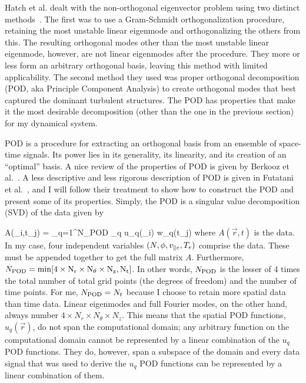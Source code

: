 Hatch et al. dealt with the non-orthogonal eigenvector problem using two distinct methods~\cite{hatch2011}. The first was to use a Gram-Schmidt orthogonalization
procedure, retaining the most unstable linear eigenmode and orthogonalizing the others from this. The resulting orthogonal modes other than the most unstable linear eigenmode, however, are not
linear eigenmodes after the procedure. They more or less form an arbitrary orthogonal basis, leaving this method with limited applicability. 
The second method they used was proper orthogonal decomposition (POD, aka Principle Component Analysis) to create orthogonal modes that best
captured the dominant turbulent structures. The POD has properties that make it the most desirable decomposition (other than the one in the previous section) for my dynamical system.

POD is a procedure for extracting an orthogonal basis from an ensemble of space-time signals. Its power lies in its generality, its linearity, and its creation of an ``optimal'' basis.
A nice review of the properties of POD is given by Berkooz et al.~\cite{berkooz1993}. A less descriptive and less rigorous description of POD is given in Futatani et al.~\cite{futatani2009},
and I will follow their treatment to show how to construct the POD and present some of its properties. Simply, the POD is a singular value decomposition (SVD) of the data given by

\beq
\label{svd}
A(_i,t_j) = \sum_{q=1}^{N_{\rm{POD}}} \sigma_q u_q(_i) w_q(t_j)
\eeq
where $A(\vec{r},t)$ is the data.  In my case, four independent variables
$(N, \phi, v_{\parallel e}, T_e)$ comprise the data. These must be appended together to get the full matrix $A$. Furthermore, $N_{\rm{POD}} = \rm{min}[4 \times N_r \times N_\theta \times N_z,N_t]$. 
In other words, $N_{\rm{POD}}$ is the lesser
of 4 times the total number of total grid points (the degrees of freedom) and the number of time points. For me, $N_{\rm{POD}} = N_t$ because I choose to retain more spatial data than time data.
Linear eigenmodes and full Fourier modes, on the other hand, always number $4 \times N_r \times N_\theta \times N_z$. This means that the spatial POD functions, $u_q(\vec{r})$,
do not span the computational domain; any arbitrary function on the computational domain cannot be represented by a linear combination of the $u_q$ POD functions. 
They do, however, span a subspace of the domain and every data signal that was used to derive the $u_q$ POD functions can be represented by a linear combination of them.

